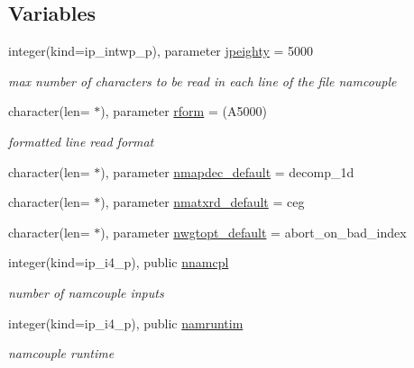 \subsection*{Variables}
\begin{DoxyCompactItemize}
\item 
integer(kind=ip\+\_\+intwp\+\_\+p), parameter \hyperlink{namespacemod__oasis__namcouple_a4fb10ad6e864dcbe34c4a8b02204a523}{jpeighty} = 5000
\begin{DoxyCompactList}\small\item\em max number of characters to be read in each line of the file namcouple \end{DoxyCompactList}\item 
character(len= $\ast$), parameter \hyperlink{namespacemod__oasis__namcouple_a32ce50ab82412ce502420b56a4e47d71}{rform} = \textquotesingle{}(A5000)\textquotesingle{}
\begin{DoxyCompactList}\small\item\em formatted line read format \end{DoxyCompactList}\item 
character(len= $\ast$), parameter \hyperlink{namespacemod__oasis__namcouple_a88ddb8ab5304da53ddf232e72b31cd45}{nmapdec\+\_\+default} = \textquotesingle{}decomp\+\_\+1d\textquotesingle{}
\item 
character(len= $\ast$), parameter \hyperlink{namespacemod__oasis__namcouple_a81f8b2668d8970564e85db2ac2465866}{nmatxrd\+\_\+default} = \textquotesingle{}ceg\textquotesingle{}
\item 
character(len= $\ast$), parameter \hyperlink{namespacemod__oasis__namcouple_a3b0f98a2f8fc07f944af7fc650ea3eff}{nwgtopt\+\_\+default} = \textquotesingle{}abort\+\_\+on\+\_\+bad\+\_\+index\textquotesingle{}
\item 
integer(kind=ip\+\_\+i4\+\_\+p), public \hyperlink{namespacemod__oasis__namcouple_a5ca7cd6a5b9f939b68492200aa92bab4}{nnamcpl}
\begin{DoxyCompactList}\small\item\em number of namcouple inputs \end{DoxyCompactList}\item 
integer(kind=ip\+\_\+i4\+\_\+p), public \hyperlink{namespacemod__oasis__namcouple_a14505eaa91b2c8ba308c63ff78652206}{namruntim}
\begin{DoxyCompactList}\small\item\em namcouple runtime \end{DoxyCompactList}\item 

\end{DoxyCompactItemize}
